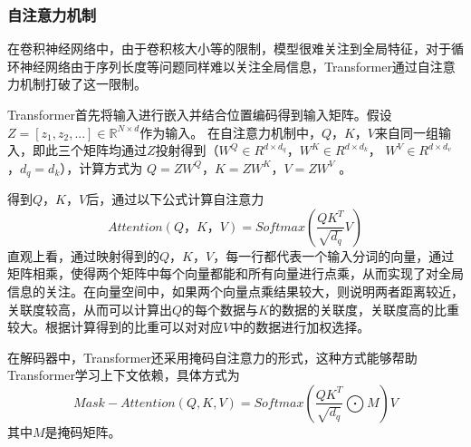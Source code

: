 \documentclass[journal]{IEEEtran}
\begin{document}
\subsubsection{自注意力机制}
在卷积神经网络中，由于卷积核大小等的限制，模型很难关注到全局特征，对于循环神经网络由于序列长度等问题同样难以关注全局信息，Transformer通过自注意力机制打破了这一限制。

Transformer首先将输入进行嵌入并结合位置编码得到输入矩阵。假设$Z = [z_1,z_2,...] \in \mathbb R^{N \times d}$作为输入。
在自注意力机制中，$Q$，$K$，$V$来自同一组输入，即此三个矩阵均通过$Z$投射得到（$W^Q \in R^{d \times d_q}$，$W^K \in R^{d \times d_k}$， $W^V \in R^{d \times d_v}$，$d_q = d_k$），计算方式为
$Q = ZW^Q$，$K = ZW^K$，$V = ZW^V$ \cite{10123038}。

得到$Q$，$K$，$V$后，通过以下公式计算自注意力
$$Attention(Q，K，V) = \textit{Softmax}(\frac{QK^T}{\sqrt{d_q}}V)$$
直观上看，通过映射得到的$Q$，$K$，$V$，每一行都代表一个输入分词的向量，通过矩阵相乘，使得两个矩阵中每个向量都能和所有向量进行点乘，从而实现了对全局信息的关注。在向量空间中，如果两个向量点乘结果较大，则说明两者距离较近，关联度较高，从而可以计算出$Q$的每个数据与$K$的数据的关联度，关联度高的比重较大。根据计算得到的比重可以对对应$V$中的数据进行加权选择。

在解码器中，Transformer还采用掩码自注意力的形式，这种方式能够帮助Transformer学习上下文依赖，具体方式为
$$Mask-Attention(Q,K,V)=\textit{Softmax}(\frac{QK^T}{\sqrt{d_q}}\bigodot M)V$$
其中$M$是掩码矩阵。
\end{document}
